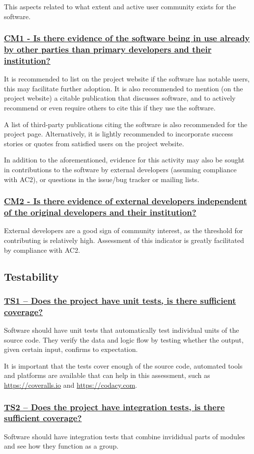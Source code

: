 \documentclass[a4paper,11pt]{article}
\newcommand{\criterion}[1]{\subsubsection*{\underline{#1}}}
\begin{document}
This aspects related to what extent and active user community exists for the
software.

\criterion{CM1 - Is there evidence of the software being in use already by
other parties than primary developers and their institution?}

It is recommended to list on the project website if the software has notable
users, this may facilitate further adoption. It is also recommended to mention
(on the project website) a citable publication that discusses software, and to
actively recommend or even require others to cite this if they use the
software.

A list of third-party publications citing the software is also recommended for
the project page. Alternatively, it is lightly recommended to
incorporate success stories or quotes from satisfied users on the project
website.

In addition to the aforementioned, evidence for this activity may also be sought
in contributions to the software by external developers (assuming
compliance with AC2), or questions in the issue/bug tracker or mailing lists.

\criterion{CM2 - Is there evidence of external developers independent of
the original developers and their institution?}

External developers are a good sign of community interest, as the threshold for
contributing is relatively high. Assessment of this indicator is greatly facilitated by
compliance with AC2.


\subsection{Testability}

\criterion{TS1 -- Does the project have unit tests, is there sufficient coverage?}

Software should have unit tests that automatically test individual units of the
source code. They verify the data and logic flow by testing whether the output,
given certain input, confirms to expectation.

It is important that the tests cover enough of the source code, automated tools
and platforms are available that can help in this assessment, such as
\url{https://coveralls.io} and \url{https://codacy.com}.

\criterion{TS2 -- Does the project have integration tests, is there sufficient coverage?}

Software should have integration tests that combine invididual parts of modules and see how they function
as a group.
\end{document}
